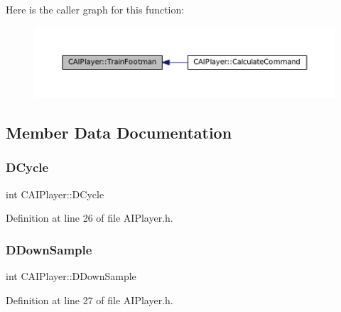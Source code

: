 Here is the caller graph for this function\+:
\nopagebreak
\begin{figure}[H]
\begin{center}
\leavevmode
\includegraphics[width=350pt]{classCAIPlayer_aa3f9c1d0d449a45a24e065d2086527b0_icgraph}
\end{center}
\end{figure}


\subsection{Member Data Documentation}
\hypertarget{classCAIPlayer_adf12a7afe7ea86410b18eff47fa95253}{}\label{classCAIPlayer_adf12a7afe7ea86410b18eff47fa95253} 
\subsubsection{\texorpdfstring{D\+Cycle}{DCycle}}
{\footnotesize\ttfamily int C\+A\+I\+Player\+::\+D\+Cycle\hspace{0.3cm}{\ttfamily [protected]}}



Definition at line 26 of file A\+I\+Player.\+h.

\hypertarget{classCAIPlayer_a091aed92cb9ad1a789900a6394d2f352}{}\label{classCAIPlayer_a091aed92cb9ad1a789900a6394d2f352} 
\subsubsection{\texorpdfstring{D\+Down\+Sample}{DDownSample}}
{\footnotesize\ttfamily int C\+A\+I\+Player\+::\+D\+Down\+Sample\hspace{0.3cm}{\ttfamily [protected]}}



Definition at line 27 of file A\+I\+Player.\+h.

\hypertarget{classCAIPlayer_a83b5113c8f7e80df54940b647c5ee2e6}{}\label{classCAIPlayer_a83b5113c8f7e80df54940b647c5ee2e6} 

